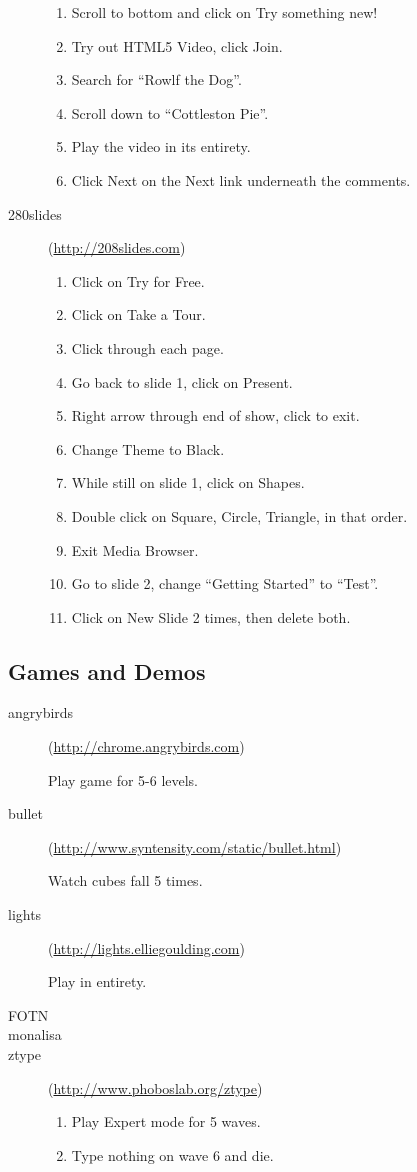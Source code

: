 \begin{description}
  \begin{enumerate}
  \item Scroll to bottom and click on Try something new!
  \item Try out HTML5 Video, click Join.
  \item Search for ``Rowlf the Dog''.
  \item Scroll down to ``Cottleston Pie''.
  \item Play the video in its entirety.
  \item Click Next on the Next link underneath the comments.
  \end{enumerate}
\item[280slides] (\url{http://208slides.com})

  \begin{enumerate}
  \item Click on Try for Free.
  \item Click on Take a Tour.
  \item Click through each page.
  \item Go back to slide 1, click on Present.
  \item Right arrow through end of show, click to exit.
  \item Change Theme to Black.
  \item While still on slide 1, click on Shapes.
  \item Double click on Square, Circle, Triangle, in that order.
  \item Exit Media Browser.
  \item Go to slide 2, change ``Getting Started'' to ``Test''.
  \item Click on New Slide 2 times, then delete both.
  \end{enumerate}
\end{description}

\subsection{Games and Demos}
\begin{description}
\item[angrybirds] (\url{http://chrome.angrybirds.com})

  Play game for 5-6 levels.
\item[bullet] (\url{http://www.syntensity.com/static/bullet.html})

  Watch cubes fall 5 times.
\item[lights] (\url{http://lights.elliegoulding.com})

  Play in entirety.
\item[FOTN]
\item[monalisa]
\item[ztype] (\url{http://www.phoboslab.org/ztype})

  \begin{enumerate}
  \item Play Expert mode for 5 waves.
  \item Type nothing on wave 6 and die.
  \end{enumerate}
\end{description}

